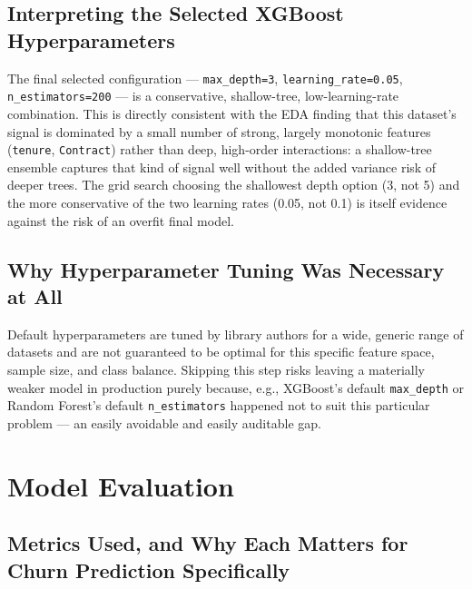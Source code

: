 \documentclass[11pt]{article}
\newcommand{\artifact}[1]{\texttt{\color{navy}#1}}
\begin{document}
\subsection{Interpreting the Selected XGBoost Hyperparameters}

The final selected configuration --- \texttt{max\_depth=3}, \texttt{learning\_rate=0.05}, \texttt{n\_estimators=200} --- is a conservative, shallow-tree, low-learning-rate combination. This is directly consistent with the EDA finding that this dataset's signal is dominated by a small number of strong, largely monotonic features (\artifact{tenure}, \artifact{Contract}) rather than deep, high-order interactions: a shallow-tree ensemble captures that kind of signal well without the added variance risk of deeper trees. The grid search choosing the shallowest depth option (3, not 5) and the more conservative of the two learning rates (0.05, not 0.1) is itself evidence against the risk of an overfit final model.

\subsection{Why Hyperparameter Tuning Was Necessary at All}

Default hyperparameters are tuned by library authors for a wide, generic range of datasets and are not guaranteed to be optimal for this specific feature space, sample size, and class balance. Skipping this step risks leaving a materially weaker model in production purely because, e.g., XGBoost's default \texttt{max\_depth} or Random Forest's default \texttt{n\_estimators} happened not to suit this particular problem --- an easily avoidable and easily auditable gap.

\section{Model Evaluation}
\label{sec:evaluation}

\subsection{Metrics Used, and Why Each Matters for Churn Prediction Specifically}
\end{document}
